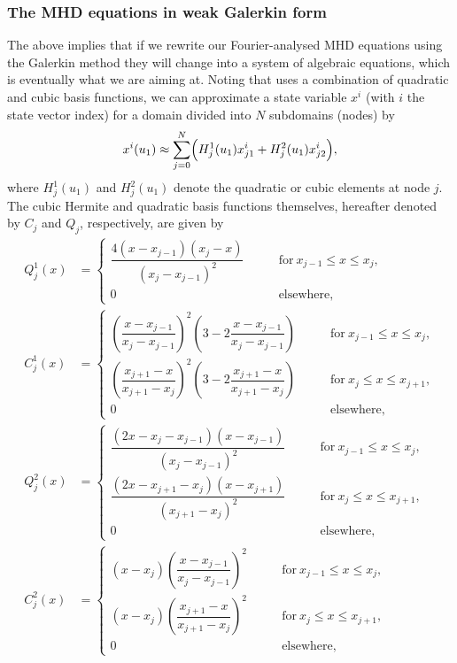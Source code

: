 \subsubsection{The MHD equations in weak Galerkin form}
The above implies that if we rewrite our Fourier-analysed MHD equations using the Galerkin method they will change into a system of algebraic equations, which is eventually what we are aiming at. Noting that {\legolas} uses a combination of quadratic and cubic basis functions, we can approximate a state variable $x^i$ (with $i$ the state vector index) for a domain divided into $N$ subdomains (nodes) by
\begin{equation} \label{eq: linear_combo}
  x^i(u_1) \approx \sum_{j=0}^N \Bigl(H_j^1(u_1)x_{j1}^i + H_j^2(u_1)x_{j2}^i\Bigr),
\end{equation}
where $H_j^1(u_1)$ and $H_j^2(u_1)$ denote the quadratic or cubic elements at node $j$.
The cubic Hermite and quadratic basis functions themselves, hereafter denoted by $C_j$ and $Q_j$, respectively, are given by
\begingroup
\allowdisplaybreaks
\begin{align}
  Q^1_j(x) &=
  \begin{cases}
    \dfrac{4\left(x - x_{j-1}\right)\left(x_j - x\right)}{\left(x_j - x_{j-1}\right)^2}
    \qquad &\text{for}~ x_{j-1} \leq x \leq x_j,	\\
    0
    \qquad &\text{elsewhere},
  \end{cases} \label{eq: basisfunction_Q1} \\
  C^1_j(x) &=
  \begin{cases}
    \left(\dfrac{x - x_{j-1}}{x_j - x_{j-1}}\right)^2\left(3 - 2\dfrac{x - x_{j-1}}{x_j - x_{j-1}}\right)
    \qquad &\text{for}~ x_{j-1} \leq x \leq x_j,	\\
    \left(\dfrac{x_{j+1} - x}{x_{j+1} - x_j}\right)^2\left(3 - 2\dfrac{x_{j+1} - x}{x_{j+1} - x_j}\right)
    \qquad &\text{for}~ x_j \leq x \leq x_{j+1},	\\
    0
    \qquad &\text{elsewhere},
  \end{cases}	\label{eq: basisfunction_C1} \\
  Q^2_j(x) &=
  \begin{cases}
    \dfrac{\left(2x - x_j - x_{j-1}\right)\left(x - x_{j-1}\right)}{\left(x_j - x_{j-1}\right)^2}
    \qquad &\text{for}~ x_{j-1} \leq x \leq x_j,	\\
    \dfrac{\left(2x - x_{j+1} - x_j\right)\left(x - x_{j+1}\right)}{\left(x_{j+1} - x_j\right)^2}
    \qquad &\text{for}~ x_j \leq x \leq x_{j+1},	\\
    0
    \qquad &\text{elsewhere},
  \end{cases} \label{eq: basisfunction_Q2} \\
  C^2_j(x) &=
  \begin{cases}
    \left(x - x_j\right)\left(\dfrac{x - x_{j-1}}{x_j - x_{j-1}}\right)^2
    \qquad &\text{for}~ x_{j-1} \leq x \leq x_j,	\\
    \left(x - x_j\right)\left(\dfrac{x_{j+1} - x}{x_{j+1} - x_j}\right)^2
    \qquad &\text{for}~ x_j \leq x \leq x_{j+1},	\\
    0
    \qquad &\text{elsewhere},
  \end{cases} \label{eq: basisfunction_C2}
\end{align}
